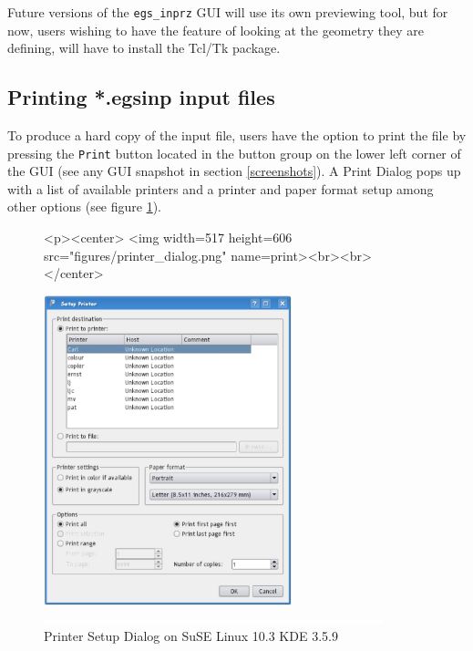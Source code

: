 \documentclass[12pt,twoside]{article}   %
\begin{document}
Future versions of the {\tt egs\_inprz} GUI will use its own
previewing tool, but for now, users wishing to have the feature of looking
at the geometry they are defining, will have to install the Tcl/Tk package.

\subsection{Printing *.egsinp input files}

 To produce a hard copy of the input file, users have the option to print the file
 by pressing the {\tt Print} button located in the button group on the lower left 
 corner of the GUI (see any GUI snapshot in section \ref{screenshots}). A Print 
 Dialog pops up with a list of available printers and a printer and  paper format 
 setup among other options (see figure \ref{print}).\\
 
\begin{figure}[htb]
\begin{htmlonly}
\begin{rawhtml}
<p><center>
<img width=517 height=606 src="figures/printer_dialog.png" name=print><br><br>
</center>
\end{rawhtml}
\end{htmlonly}
\begin{latexonly}
\begin{center}
\includegraphics[height=9cm]{figures/printer_dialog}
\end{center}
\end{latexonly}
\begin{center}
\includegraphics[height=1mm]{figures/fake2}
\end{center}
\caption{\label{print}Printer Setup Dialog on SuSE Linux 10.3 KDE 3.5.9}
\end{figure}
\end{document}
